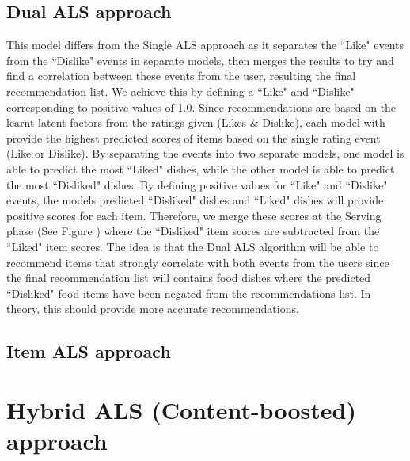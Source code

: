 \subsection{Dual ALS approach} 

This model differs from the Single ALS approach as it separates the ``Like" events from the ``Dislike" events in separate models, then merges the results to try and find a correlation between these events from the user, resulting the final recommendation list. We achieve this by defining a ``Like" and ``Dislike" corresponding to positive values of 1.0. Since recommendations are based on the learnt latent factors from the ratings given (Likes \& Dislike), each model with provide the highest predicted scores of items based on the single rating event (Like or Dislike). By separating the events into two separate models, one model is able to predict the most ``Liked" dishes, while the other model is able to predict the most ``Disliked" dishes. By defining positive values for ``Like" and ``Dislike" events, the models predicted ``Disliked" dishes and ``Liked" dishes will provide positive scores for each item. Therefore, we merge these scores at the Serving phase (See Figure ) where the ``Disliked" item scores are subtracted from the ``Liked" item scores. The idea is that the Dual ALS algorithm will be able to recommend items that strongly correlate with both events from the users since the final recommendation list will contains food dishes where the predicted ``Disliked" food items have been negated from the recommendations list. In theory, this should provide more accurate recommendations.


\subsection{Item ALS approach}

\section{Hybrid ALS (Content-boosted) approach}



